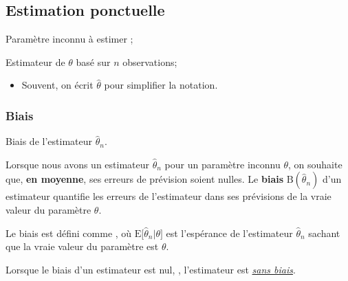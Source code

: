 \documentclass[french]{article}
\begin{document}
\begin{multicols*}{2}
\subsection{Estimation ponctuelle}\label{subsec:estimationPonctuelle}
\begin{distributions}[Notation]
\begin{description}[font = \normalfont]
	\item[$\theta$]	Paramètre inconnu à estimer ;
	\item[$\hat{\theta}_{n}$]	Estimateur de $\theta$ basé sur $n$ observations;
		\begin{itemize}[leftmargin = *]
		\item	Souvent, on écrit $\hat{\theta}$ pour simplifier la notation.
		\end{itemize}
\end{description}
\end{distributions}



\columnbreak	
\subsubsection{Biais}
\begin{distributions}[Notation]
\begin{description}[font = \normalfont]
	\item[$\text{B}(\hat{\theta}_{n})$]	Biais de l'estimateur $\hat{\theta}_{n}$.
\end{description}
\end{distributions}

\begin{rappel_enhanced}[Motivation]
Lorsque nous avons un estimateur $\hat{\theta}_{n}$ pour un paramètre inconnu $\theta$, on souhaite que, \textbf{en moyenne}, ses erreurs de prévision soient nulles. Le \textbf{biais} $\text{B}(\hat{\theta}_{n})$ d'un estimateur quantifie les erreurs de l'estimateur dans ses prévisions de la vraie valeur du paramètre $\theta$.
\end{rappel_enhanced}


\begin{definitionNOHFILL}
Le biais est défini comme , où $\text{E}\lbrack\hat{\theta}_{n} | \theta\rbrack$ est l'espérance de l'estimateur $\hat{\theta}_{n}$ sachant que la vraie valeur du paramètre est $\theta$.

\begin{definitionNOHFILLprop}
Lorsque le biais d'un estimateur est nul, , l'estimateur est \underline{\textit{sans biais}}.
\end{definitionNOHFILLprop}


\end{definitionNOHFILL}
\end{multicols*}
\end{document}
